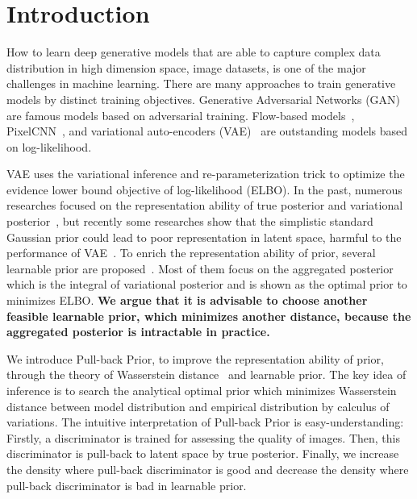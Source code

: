 \section{Introduction}

How to learn deep generative models that are able to capture complex data distribution in high dimension space, \EG image datasets, is one of the major challenges in machine learning. There are many approaches to train generative models by distinct training objectives. Generative Adversarial Networks (GAN)~\cite{goodfellow2014generative} are famous models based on adversarial training. Flow-based models~\cite{dinh2016density,kingma2018glow}, PixelCNN~\cite{van2016conditional}, and variational auto-encoders (VAE)~\cite{kingma2014auto,rezende_stochastic_2014} are outstanding models based on log-likelihood. 

VAE uses the variational inference and re-parameterization trick to optimize the evidence lower bound objective of log-likelihood (ELBO). In the past, numerous researches focused on the representation ability of true posterior and variational posterior~\cite{kingma2016improved,tomczak2016improving}, but recently some researches show that the simplistic standard Gaussian prior could lead to poor representation in latent space, harmful to the performance of VAE~\cite{tomczak2018vae}. To enrich the representation ability of prior, several learnable prior are proposed~\cite{tomczak2018vae,bauer2019resampled,takahashi2019variational}. Most of them focus on the aggregated posterior which is the integral of variational posterior and is shown as the optimal prior to minimizes ELBO. \textbf{We argue that it is advisable to choose another feasible learnable prior, which minimizes another distance, because the aggregated posterior is intractable in practice. } 

We introduce Pull-back Prior, to improve the representation ability of prior, through the theory of Wasserstein distance~\cite{arjovsky2017wasserstein} and learnable prior. The key idea of inference is to search the analytical optimal prior which minimizes Wasserstein distance between model distribution and empirical distribution by calculus of variations. 
The intuitive interpretation of Pull-back Prior is easy-understanding: Firstly, a discriminator is trained for assessing the quality of images. Then, this discriminator is pull-back to latent space by true posterior. Finally, we increase the density where pull-back discriminator is good and decrease the density where pull-back discriminator is bad in learnable prior. 


